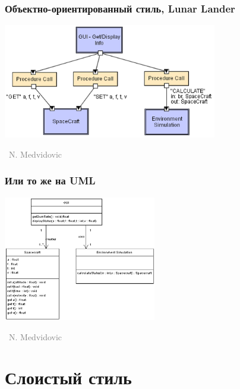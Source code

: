 \documentclass[xetex,mathserif,serif]{beamer}
\newcommand{\attribution}[1] {
	\vspace{-5mm}\begin{flushright}\begin{scriptsize}\textcolor{gray}{\textcopyright\, #1}\end{scriptsize}\end{flushright}
}
\begin{document}
	\begin{frame}
		\frametitle{Объектно-ориентированный стиль, Lunar Lander}
		\begin{center}
			\includegraphics[width=0.7\textwidth]{objectOrientedLL.png}
			\attribution{N. Medvidovic}
		\end{center}
	\end{frame}

	\begin{frame}
		\frametitle{Или то же на UML}
		\begin{center}
			\includegraphics[width=0.5\textwidth]{objectOrientedLLUML.png}
			\attribution{N. Medvidovic}
		\end{center}
	\end{frame}

	\section{Слоистый стиль}
\end{document}
